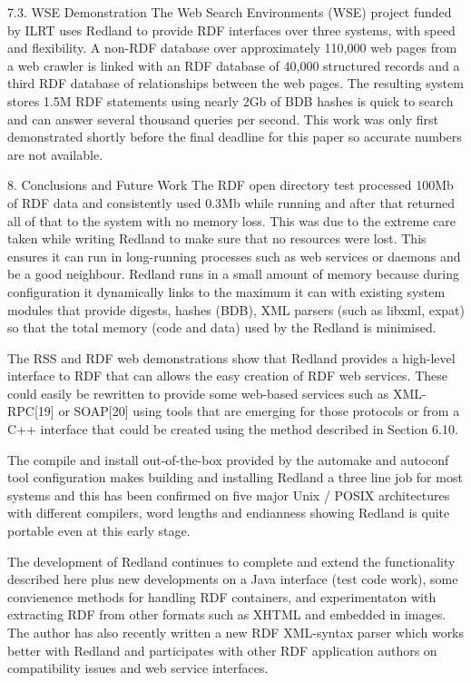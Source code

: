 \documentclass[11pt]{article}
\begin{document}
    7.3. WSE Demonstration
    The Web Search Environments (WSE) project funded by ILRT uses Redland to provide RDF interfaces over three systems, with speed and flexibility. A non-RDF database over approximately 110,000 web pages from a web crawler is linked with an RDF database of 40,000 structured records and a third RDF database of relationships between the web pages. The resulting system stores 1.5M RDF statements using nearly 2Gb of BDB hashes is quick to search and can answer several thousand queries per second. This work was only first demonstrated shortly before the final deadline for this paper so accurate numbers are not available.

    8. Conclusions and Future Work
    The RDF open directory test processed 100Mb of RDF data and consistently used 0.3Mb while running and after that returned all of that to the system with no memory loss. This was due to the extreme care taken while writing Redland to make sure that no resources were lost. This ensures it can run in long-running processes such as web services or daemons and be a good neighbour. Redland runs in a small amount of memory because during configuration it dynamically links to the maximum it can with existing system modules that provide digests, hashes (BDB), XML parsers (such as libxml, expat) so that the total memory (code and data) used by the Redland is minimised.

    The RSS and RDF web demonstrations show that Redland provides a high-level interface to RDF that can allows the easy creation of RDF web services. These could easily be rewritten to provide some web-based services such as XML-RPC[19] or SOAP[20] using tools that are emerging for those protocols or from a C++ interface that could be created using the method described in Section 6.10.

    The compile and install out-of-the-box provided by the automake and autoconf tool configuration makes building and installing Redland a three line job for most systems and this has been confirmed on five major Unix / POSIX architectures with different compilers, word lengths and endianness showing Redland is quite portable even at this early stage.

    The development of Redland continues to complete and extend the functionality described here plus new developments on a Java interface (test code work), some convienence methods for handling RDF containers, and experimentaton with extracting RDF from other formats such as XHTML and embedded in images. The author has also recently written a new RDF XML-syntax parser which works better with Redland and participates with other RDF application authors on compatibility issues and web service interfaces.
\end{document}

